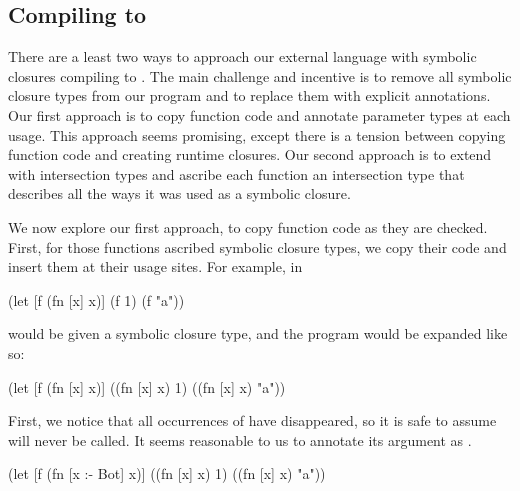 

\subsection{Compiling to \ltiFsub}

There are a least two ways to approach our external language
with symbolic closures compiling to \ltiFsub.
The main challenge and incentive is to remove all symbolic
closure types from our program and to replace them with
explicit annotations.
Our first approach is to copy function code and annotate
parameter types at each usage.
This approach seems promising, except there is a tension between
copying function code and creating runtime closures.
Our second approach is to extend \ltiFsub with intersection types
and ascribe each function an intersection type that 
describes all the ways it was used as a symbolic closure.

We now explore our first approach, to copy function code as they
are checked.
First, for those functions ascribed symbolic closure types, we
copy their code and insert them at their usage sites.
For example,  in 

\begin{cljlisting}
(let [f (fn [x] x)]
  (f 1)
  (f "a"))
\end{cljlisting}

would be given a symbolic closure type, and
the program would be expanded like so:

\begin{cljlisting}
(let [f (fn [x] x)]
  ((fn [x] x) 1)
  ((fn [x] x) "a"))
\end{cljlisting}

First, we notice that all occurrences of  have disappeared,
so it is safe to assume  will never be called. It seems
reasonable to us to annotate its argument as .

\begin{cljlisting}
(let [f (fn [x :- Bot] x)]
  ((fn [x] x) 1)
  ((fn [x] x) "a"))
\end{cljlisting}


